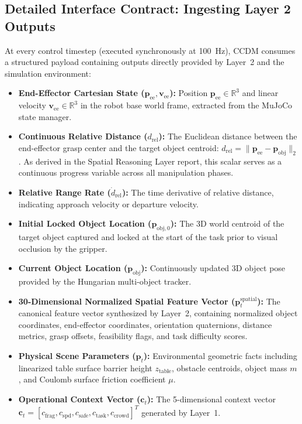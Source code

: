 \documentclass[10pt,a4paper]{article}
\begin{document}
\subsection{Detailed Interface Contract: Ingesting Layer 2 Outputs}
At every control timestep (executed synchronously at 100~Hz), CCDM consumes a structured payload containing outputs directly provided by Layer~2 and the simulation environment:
\begin{itemize}
    \item \textbf{End-Effector Cartesian State ($\mathbf{p}_{\mathrm{ee}}, \mathbf{v}_{\mathrm{ee}}$):} Position $\mathbf{p}_{\mathrm{ee}} \in \mathbb{R}^3$ and linear velocity $\mathbf{v}_{\mathrm{ee}} \in \mathbb{R}^3$ in the robot base world frame, extracted from the MuJoCo state manager.
    \item \textbf{Continuous Relative Distance ($d_{\mathrm{rel}}$):} The Euclidean distance between the end-effector grasp center and the target object centroid: $d_{\mathrm{rel}} = \|\mathbf{p}_{\mathrm{ee}} - \mathbf{p}_{\mathrm{obj}}\|_2$. As derived in the Spatial Reasoning Layer report, this scalar serves as a continuous progress variable across all manipulation phases.
    \item \textbf{Relative Range Rate ($\dot{d}_{\mathrm{rel}}$):} The time derivative of relative distance, indicating approach velocity or departure velocity.
    \item \textbf{Initial Locked Object Location ($\mathbf{p}_{\mathrm{obj},0}$):} The 3D world centroid of the target object captured and locked at the start of the task prior to visual occlusion by the gripper.
    \item \textbf{Current Object Location ($\mathbf{p}_{\mathrm{obj}}$):} Continuously updated 3D object pose provided by the Hungarian multi-object tracker.
    \item \textbf{30-Dimensional Normalized Spatial Feature Vector ($\mathbf{p}_t^{\mathrm{spatial}}$):} The canonical feature vector synthesized by Layer~2, containing normalized object coordinates, end-effector coordinates, orientation quaternions, distance metrics, grasp offsets, feasibility flags, and task difficulty scores.
    \item \textbf{Physical Scene Parameters ($\mathbf{p}_t$):} Environmental geometric facts including linearized table surface barrier height $z_{\mathrm{table}}$, obstacle centroids, object mass $m$, and Coulomb surface friction coefficient $\mu$.
    \item \textbf{Operational Context Vector ($\mathbf{c}_t$):} The 5-dimensional context vector $\mathbf{c}_t = [c_{\mathrm{frag}}, c_{\mathrm{spd}}, c_{\mathrm{safe}}, c_{\mathrm{task}}, c_{\mathrm{crowd}}]^T$ generated by Layer~1.
\end{itemize}
\end{document}
